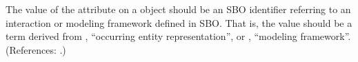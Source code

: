 The value of the attribute  on a \Model object should be an
SBO identifier referring to an interaction or modeling framework defined in SBO.  That
is, the value should be a term derived from \sbointeractionID,
``occurring entity representation'', or \sboframeworkID, ``modeling framework''.  (References: .)
